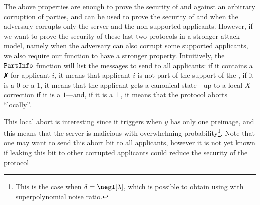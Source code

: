 The above properties are enough to prove the security of \blind{} and \blindSup{} against an arbitrary corruption of parties, and can be used to prove the security of \blindCan{} and \blindCanSup{} when the adversary corrupts only the server and the non-supported applicants. However, if we want to prove the security of these last two protocols in a stronger attack model, namely when the adversary can also corrupt some supported applicants, we also require our function to have a stronger property. Intuitively, the ${\tt PartInfo}{}$ function will list the messages to send to all applicants: if it contains a $\cross$ for applicant $i$, it means that applicant $i$ is not part of the support of the \GHZ{}, if it is a $0$ or a $1$, it means that the applicant gets a \GHZ{} canonical state---up to a local $X$ correction if it is a $1$---and, if it is a $\bot$, it means that the protocol aborts ``locally''.

\begin{remark}
  This local abort is interesting since it triggers when $y$ has only one preimage, and this means that the server is malicious with overwhelming probability\footnote{This is the case when $\delta = \negl[\lambda]$, which is possible to obtain using \LWE{} with superpolynomial noise ratio.}. Note that one may want to send this abort bit to all applicants, however it is not yet known if leaking this bit to other corrupted applicants could reduce the security of the protocol
\end{remark}

